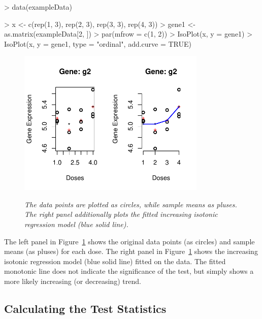 \documentclass[10pt]{mybook4}
\begin{document}
\begin{Schunk}
\begin{Sinput}
> data(exampleData)
\end{Sinput}
\end{Schunk}


\begin{Schunk}
\begin{Sinput}
> x <- c(rep(1, 3), rep(2, 3), rep(3, 3), rep(4, 3))
> gene1 <- as.matrix(exampleData[2, ])
> par(mfrow = c(1, 2))
> IsoPlot(x, y = gene1)
> IsoPlot(x, y = gene1, type = "ordinal", add.curve = TRUE)
\end{Sinput}
\end{Schunk}
 
 
 

\begin{figure}[!h]
\centering
{\includegraphics[width=0.8\textwidth]{IsoGene-IsoPlot.pdf}}
\caption{\em{The data points are plotted as circles, while sample
means as pluses. The right panel additionally plots the fitted
increasing isotonic regression model (blue solid line).}}
\label{exgene}
\end{figure}




The left panel in Figure~\ref{exgene} shows the original data points
(as circles) and sample means (as pluses) for each dose. The right
panel in Figure~\ref{exgene} shows the increasing isotonic
regression model (blue solid line) fitted on the data. The fitted
monotonic line does not indicate the significance of the test, but
simply shows a more likely increasing (or decreasing) trend.


\subsection{Calculating the Test Statistics}
\end{document}
